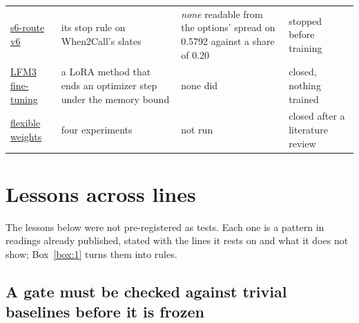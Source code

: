 \documentclass[10pt]{article}
\begin{document}
\begin{table}[htbp]
\begin{tabularx}{\linewidth}{@{}P{2.7cm}LLP{2.7cm}@{}}
\href{https://github.com/maxgfr/skycmd/blob/main/docs/s6-route6-prereg.md}{s6-route v6} & its stop rule on When2Call's slates & \emph{none} readable from the options' spread on 0.5792 against a share of 0.20 & stopped before training \\
\href{https://github.com/maxgfr/skycmd/blob/main/docs/lfm3-ft-prereg.md}{LFM3 fine-tuning} & a LoRA method that ends an optimizer step under the memory bound & none did & closed, nothing trained \\
\href{https://github.com/maxgfr/skycmd/blob/main/docs/weights-prereg.md}{flexible weights} & four experiments & not run & closed after a literature review \\
\bottomrule
\end{tabularx}
\end{table}

\section{Lessons across lines}\label{sec:5}

The lessons below were not pre-registered as tests. Each one is a pattern in readings already published, stated with the lines it rests on and what it does not show; Box~\ref{box:1} turns them into rules.

\subsection{A gate must be checked against trivial baselines before it is frozen}\label{sec:5.1}
\end{document}
